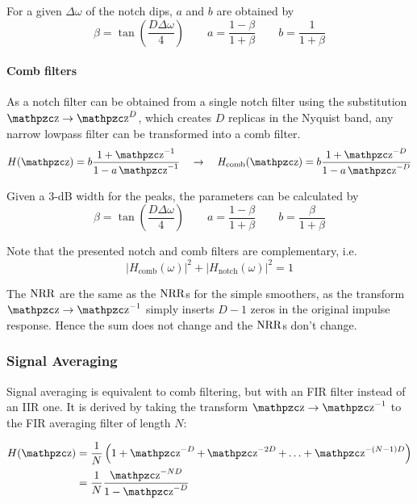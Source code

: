 For a given $\Delta\omega$ of the notch dips, $a$ and $b$  are obtained by
\begin{equation*}
	\beta = \tan\left(\frac{D\Delta\omega}{4}\right) \qquad a = \frac{1-\beta}{1+\beta} \qquad b = \frac{1}{1+\beta}
\end{equation*}

\paragraph{Comb filters}
As a notch filter can be obtained from a single notch filter using the
substitution $\z \to \z^D$, which creates $D$ replicas in the Nyquist band,
any narrow lowpass filter can be transformed into a comb filter.
\begin{equation*}
	H(\z) = b \frac{1+\z^{-1}}{1-a\z^{-1}} \quad \to \quad
	H_{\text{comb}}(\z) = b \frac{1+\z^{-D}}{1-a\z^{-D}}
\end{equation*}

Given a 3-dB width for the peaks, the parameters can be calculated by
\begin{equation*}
	\beta = \tan\left(\frac{D\Delta\omega}{4}\right) \qquad 
	a = \frac{1-\beta}{1+\beta} \qquad b = \frac{\beta}{1+\beta}
\end{equation*}

Note that the presented notch and comb filters are complementary, i.e.
\begin{equation*}
	\left|H_{\text{comb}}(\omega)\right|^2 + \left|H_{\text{notch}}(\omega)\right|^2 = 1
\end{equation*}

The $\operatorname{\text{NRR}}$ are the same as the $\operatorname{\text{NRR}}$s for the simple smoothers, as the
transform $\z \to \z^{-1}$ simply inserts $D-1$ zeros in the original
impulse response. Hence the sum does not change and the $\operatorname{\text{NRR}}$s don't change.


\subsubsection{Signal Averaging}
Signal averaging is equivalent to comb filtering, but with an FIR filter
instead of an IIR one. It is derived by taking the transform $\z \to \z^{-1}$
to the FIR averaging filter of length $N$:

\begin{align*}
	H(\z)&=\frac{1}{N}\left( 1+ \z^{-D}+\z^{-2D}+\ldots + \z^{-(N-1)D} \right) \\
	&= \frac{1}{N}\frac{\z^{-ND}}{1-\z^{-D}}
\end{align*}


